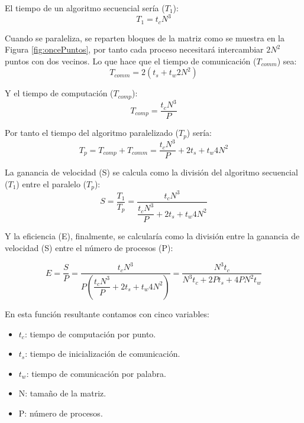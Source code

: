 El tiempo de un algoritmo secuencial sería ($T_{1}$):
\begin{equation}
	T_{1} = t_{c}N^{3}
\end{equation}

Cuando se paraleliza, se reparten bloques de la matriz como se muestra en la Figura \ref{fig:oncePuntos}, por tanto cada proceso necesitará intercambiar $2N^{2}$ puntos con dos vecinos. Lo que hace que el tiempo de comunicación ($T_{comm}$) sea:
\begin{equation}
	T_{comm} = 2(t_{s} + t_{w}2N^{2})
\end{equation}

Y el tiempo de computación ($T_{comp}$):
\begin{equation}
	T_{comp} = \dfrac{t_{c}N^{3}}{P} 
\end{equation}

Por tanto el tiempo del algoritmo paralelizado ($T_{p}$) sería:
\begin{equation}
	T_{p} = T_{comp} + T_{comm} = \dfrac{t_{c}N^{3}}{P} + 2t_{s} + t_{w}4N^{2}
\end{equation}

La ganancia de velocidad (S) se calcula como la división del algoritmo secuencial ($T_{1}$) entre el paralelo ($T_{p}$):
\begin{equation}
	S = \dfrac{T_{1}}{T_{p}} = \dfrac{t_{c}N^{3}}{\dfrac{t_{c}N^{3}}{P} + 2t_{s} + t_{w}4N^{2}}
\end{equation}

Y la eficiencia (E), finalmente, se calcularía como la división entre la ganancia de velocidad (S) entre el número de procesos (P):

\begin{equation}
	E = \dfrac{S}{P} = \dfrac{t_{c}N^{3}}{P( \dfrac{t_{c}N^{3}}{P} + 2t_{s} + t_{w}4N^{2})} = \dfrac{N^{3}t_{c}}{N^{3}t_{c} + 2Pt_{s} + 4PN^{2}t_{w}}
\end{equation}

En esta función resultante contamos con cinco variables:
\begin{itemize}
	\item $t_{c}$: tiempo de computación por punto.
	\item $t_{s}$: tiempo de inicialización de comunicación.
	\item $t_{w}$: tiempo de comunicación por palabra.
	\item N: tamaño de la matriz.
	\item P: número de procesos.
\end{itemize}


